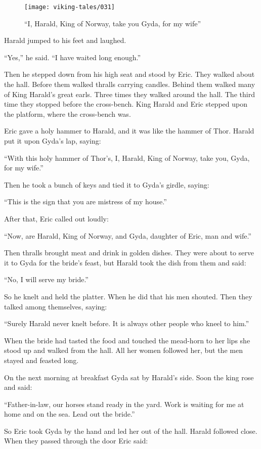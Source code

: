 \begin{figure}
    \centering
    \texttt{[image: viking-tales/031]}
    \caption{``I, Harald, King of Norway, take you Gyda, for my wife''}
\end{figure}

Harald jumped to his feet and laughed.

``Yes,'' he said. ``I have waited long enough.''

Then he stepped down from his high seat and stood by Eric. They walked
about the hall. Before them walked thralls carrying candles. Behind them
walked many of King Harald's great earls. Three times they walked around
the hall. The third time they stopped before the cross-bench. King
Harald and Eric stepped upon the platform, where the cross-bench was.

Eric gave a holy hammer to Harald, and it was like the hammer of Thor.
Harald put it upon Gyda's lap, saying:

``With this holy hammer of Thor's, I, Harald, King of Norway, take you,
Gyda, for my wife.''

Then he took a bunch of keys and tied it to Gyda's girdle, saying:

``This is the sign that you are mistress of my house.''

After that, Eric called out loudly:

``Now, are Harald, King of Norway, and Gyda, daughter of Eric, man and
wife.''

Then thralls brought meat and drink in golden dishes. They were about to
serve it to Gyda for the bride's feast, but Harald took the dish from
them and said:

``No, I will serve my bride.''

So he knelt and held the platter. When he did that his men shouted. Then
they talked among themselves, saying:

``Surely Harald never knelt before. It is always other people who kneel
to him.''

When the bride had tasted the food and touched the mead-horn to her lips
she stood up and walked from the hall. All her women followed her, but
the men stayed and feasted long.

On the next morning at breakfast Gyda sat by Harald's side. Soon the
king rose and said:

``Father-in-law, our horses stand ready in the yard. Work is waiting for
me at home and on the sea. Lead out the bride.''

So Eric took Gyda by the hand and led her out of the hall. Harald
followed close. When they passed through the door Eric said:

